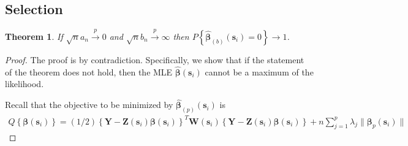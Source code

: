 \documentclass[authoryear, review, 11pt]{elsarticle}
\newtheorem{theorem}{Theorem}[section]
\begin{document}
  \subsection{Selection}
    
    \begin{theorem}\label{theorem:selection}   
      If $\sqrt{n} a_n \xrightarrow{p} 0$ and $\sqrt{n} b_n \xrightarrow{p} \infty$ then $P \left\{ \hat{\bm{\beta}}_{(b)} (\bm{s}_i) = 0 \right\} \to 1$.
    \end{theorem}

    \begin{proof}
      The proof is by contradiction. Specifically, we show that if the statement of the theorem does not hold, then the MLE $\hat{\bm{\beta}}(\bm{s}_i)$ cannot be a maximum of the likelihood.
      
      Recall that the objective to be minimized by $\hat{\bm{\beta}}_{(p)} (\bm{s}_i)$ is
      \begin{align}\label{eq:objective}
        Q \left\{ \bm{\beta}(\bm{s}_i) \right\} = (1/2) \left\{ \bm{Y} - \bm{Z}(\bm{s}_i) \bm{\beta}(\bm{s}_i) \right\}^T \bm{W}(\bm{s}_i) \left\{ \bm{Y} - \bm{Z}(\bm{s}_i) \bm{\beta}(\bm{s}_i) \right\} + n \sum_{j=1}^p \lambda_j \| \bm{\beta}_p(\bm{s}_i) \|
      \end{align}


\end{proof}
\end{document}

